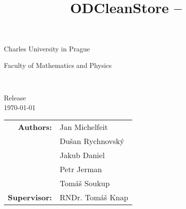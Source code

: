 \title{ODCleanStore -- \documentname}

\begin{titlepage}
\begin{center}

\large
Charles University in Prague

\smallskip

Faculty of Mathematics and Physics



\\
\medskip
{}


\begin{spacing}{1.5} 
{\bf\Huge \documentname}
\end{spacing}

Release \version\\
\today


\begin{tabular}{rl}

\textbf{Authors:} & Jan Michelfeit \\
& Du\v san Rychnovsk\'y\\
& Jakub Daniel\\
& Petr Jerman\\
& Tom\' a\v s Soukup\\
\noalign{\vspace{3mm}}
\textbf{Supervisor:} & RNDr. Tom\' a\v s Knap
\end{tabular}

\end{center}
\end{titlepage}

\newpage